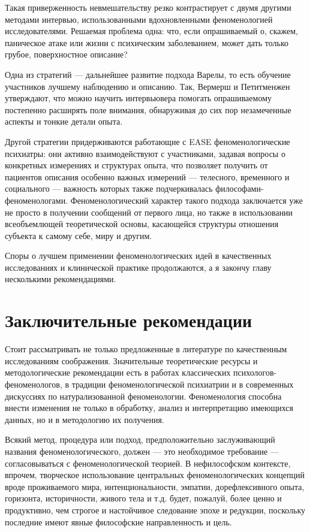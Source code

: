 \documentclass[11pt]{book}
\begin{document}
Такая приверженность невмешательству резко контрастирует с двумя другими методами интервью, использованными вдохновленными феноменологией исследователями. Решаемая проблема одна: что, если опрашиваемый о, скажем, паническое атаке или жизни с психическим заболеванием, может дать только грубое, поверхностное описание?

Одна из стратегий --- дальнейшее развитие подхода Варелы, то есть обучение участников лучшему наблюдению и описанию. Так, Вермерш и Петитменжен утверждают, что можно научить интервьювера помогать опрашиваемому постепенно расширять поле внимания, обнаруживая до сих пор незамеченные аспекты и тонкие детали опыта.

Другой стратегии придерживаются работающие с EASE феноменологические психиатры: они активно взаимодействуют с участниками, задавая вопросы о конкретных измерениях и структурах опыта, что позволяет получить от пациентов описания особенно важных измерений --- телесного, временного и социального --- важность которых также подчеркивалась философами-феноменологами. Феноменологический характер такого подхода заключается уже не просто в получении сообщений от первого лица, но также в использовании всеобъемлющей теоретической основы, касающейся структуры отношения субъекта к самому себе, миру и другим.

Споры о лучшем применении феноменологических идей в качественных исследованиях и клинической практике продолжаются, а я закончу главу несколькими рекомендациями.

\section{Заключительные рекомендации}

Стоит рассматривать не только предложенные в литературе по качественным исследованиям соображения. Значительные теоретические ресурсы и методологические рекомендации есть в работах классических психологов-феноменологов, в традиции феноменологической психиатрии и в современных дискуссиях по натурализованной феноменологии. Феноменология способна внести изменения не только в обработку, анализ и интерпретацию имеющихся данных, но и в методологию их получения.

Всякий метод, процедура или подход, предположительно заслуживающий названия феноменологического, должен --- это необходимое требование --- согласовываться с феноменологической теорией. В нефилософском контексте, впрочем, творческое использование центральных феноменологических концепций вроде проживаемого мира, интенциональности, эмпатии, дорефлексивного опыта, горизонта, историчности, живого тела и т.д. будет, пожалуй, более ценно и продуктивно, чем строгое и настойчивое следование эпохе и редукции, поскольку последние имеют явные философские направленность и цель.
\end{document}
